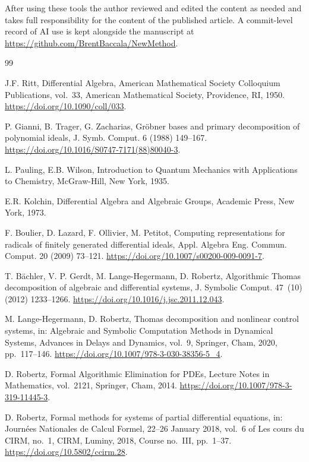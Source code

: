 \documentclass{article}
\theoremstyle{definition}
\theoremstyle{plain}
\begin{document}
After using these tools the author reviewed and edited the content as needed
and takes full responsibility for the content of the published article.
A commit-level record of AI use is kept
alongside the manuscript at
\url{https://github.com/BrentBaccala/NewMethod}.

\begin{thebibliography}{99}

J.F. Ritt, Differential Algebra, American Mathematical Society Colloquium Publications, vol.~33, American Mathematical Society, Providence, RI, 1950. \url{https://doi.org/10.1090/coll/033}.

P. Gianni, B. Trager, G. Zacharias, Gr\"obner bases and primary decomposition of polynomial ideals, J. Symb. Comput. 6 (1988) 149--167. \url{https://doi.org/10.1016/S0747-7171(88)80040-3}.

L. Pauling, E.B. Wilson, Introduction to Quantum Mechanics with Applications to Chemistry, McGraw-Hill, New York, 1935.

E.R. Kolchin, Differential Algebra and Algebraic Groups, Academic Press, New York, 1973.

F. Boulier, D. Lazard, F. Ollivier, M. Petitot, Computing representations for radicals of finitely generated differential ideals, Appl. Algebra Eng. Commun. Comput. 20 (2009) 73--121. \url{https://doi.org/10.1007/s00200-009-0091-7}.

T. B\"achler, V. P. Gerdt, M. Lange-Hegermann, D. Robertz, Algorithmic Thomas decomposition of algebraic and differential systems, J. Symbolic Comput. 47~(10) (2012) 1233--1266. \url{https://doi.org/10.1016/j.jsc.2011.12.043}.

M. Lange-Hegermann, D. Robertz, Thomas decomposition and nonlinear control systems, in: Algebraic and Symbolic Computation Methods in Dynamical Systems, Advances in Delays and Dynamics, vol.~9, Springer, Cham, 2020, pp.~117--146. \url{https://doi.org/10.1007/978-3-030-38356-5_4}.

D. Robertz, Formal Algorithmic Elimination for PDEs, Lecture Notes in Mathematics, vol.~2121, Springer, Cham, 2014. \url{https://doi.org/10.1007/978-3-319-11445-3}.

D. Robertz, Formal methods for systems of partial differential equations, in: Journ\'ees Nationales de Calcul Formel, 22--26 January 2018, vol.~6 of Les cours du CIRM, no.~1, CIRM, Luminy, 2018, Course no.~III, pp.~1--37. \url{https://doi.org/10.5802/ccirm.28}.


\end{thebibliography}
\end{document}
